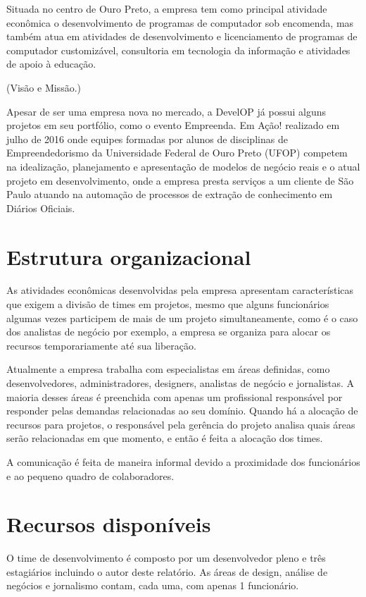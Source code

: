 \documentclass[
	12pt,				%
	openright,			%
	twoside,			%
	a4paper,			%
	english,			%
	french,				%
	spanish,			%
	brazil,				%
	]{abntex2}
\begin{document}
Situada no centro de Ouro Preto, a empresa tem como principal atividade econômica o desenvolvimento de programas de computador sob encomenda, mas também atua em atividades de desenvolvimento e licenciamento de programas de computador customizável, consultoria em tecnologia da informação e atividades de apoio à educação.

(Visão e Missão.)

Apesar de ser uma empresa nova no mercado, a DevelOP já possui alguns projetos em seu portfólio, como o evento Empreenda. Em Ação! realizado em julho de 2016 onde equipes formadas por alunos de disciplinas de Empreendedorismo da Universidade Federal de Ouro Preto (UFOP) competem na idealização, planejamento e apresentação de modelos de negócio reais e o atual projeto em desenvolvimento, onde a empresa presta serviços a um cliente de São Paulo atuando na automação de processos de extração de conhecimento em Diários Oficiais.

\section{Estrutura organizacional}

As atividades econômicas desenvolvidas pela empresa apresentam características que exigem a divisão de times em projetos, mesmo que alguns funcionários algumas vezes participem de mais de um projeto simultaneamente, como é o caso dos analistas de negócio por exemplo, a empresa se organiza para alocar os recursos temporariamente até sua liberação.

Atualmente a empresa trabalha com especialistas em áreas definidas, como desenvolvedores, administradores, designers, analistas de negócio e jornalistas. A maioria desses áreas é preenchida com apenas um profissional responsável por responder pelas demandas relacionadas ao seu domínio. Quando há a alocação de recursos para projetos, o responsável pela gerência do projeto analisa quais áreas serão relacionadas em que momento, e então é feita a alocação dos times.

A comunicação é feita de maneira informal devido a proximidade dos funcionários e ao pequeno quadro de colaboradores.

\section{Recursos disponíveis}

O time de desenvolvimento é composto por um desenvolvedor pleno e três estagiários incluindo o autor deste relatório. As áreas de design, análise de negócios e jornalismo contam, cada uma, com apenas 1 funcionário.
\end{document}
